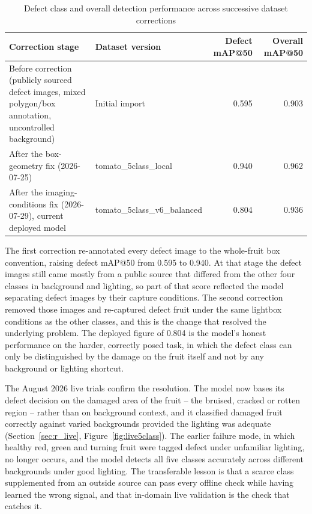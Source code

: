 \begin{table}[H]
\caption{Defect class and overall detection performance across successive dataset corrections}
\label{tab:corrections}
\centering
\begin{tabularx}{\textwidth}{p{4.6cm} p{3.0cm} r r}
\toprule
\textbf{Correction stage} & \textbf{Dataset version} & \textbf{Defect mAP@50} & \textbf{Overall mAP@50} \\
\midrule
Before correction (publicly sourced defect images, mixed polygon/box annotation, uncontrolled background) & Initial import & 0.595 & 0.903 \\
After the box-geometry fix (2026-07-25) & tomato\_5class\_local & 0.940 & 0.962 \\
After the imaging-conditions fix (2026-07-29), current deployed model & tomato\_5class\_v6\_balanced & 0.804 & 0.936 \\
\bottomrule
\end{tabularx}
\end{table}

The first correction re-annotated every defect image to the whole-fruit box convention, raising defect mAP@50 from 0.595 to 0.940. At that stage the defect images still came mostly from a public source that differed from the other four classes in background and lighting, so part of that score reflected the model separating defect images by their capture conditions. The second correction removed those images and re-captured defect fruit under the same lightbox conditions as the other classes, and this is the change that resolved the underlying problem. The deployed figure of 0.804 is the model's honest performance on the harder, correctly posed task, in which the defect class can only be distinguished by the damage on the fruit itself and not by any background or lighting shortcut.

The August 2026 live trials confirm the resolution. The model now bases its defect decision on the damaged area of the fruit -- the bruised, cracked or rotten region -- rather than on background context, and it classified damaged fruit correctly against varied backgrounds provided the lighting was adequate (Section~\ref{sec:r_live}, Figure~\ref{fig:live5class}). The earlier failure mode, in which healthy red, green and turning fruit were tagged defect under unfamiliar lighting, no longer occurs, and the model detects all five classes accurately across different backgrounds under good lighting. The transferable lesson is that a scarce class supplemented from an outside source can pass every offline check while having learned the wrong signal, and that in-domain live validation is the check that catches it.

